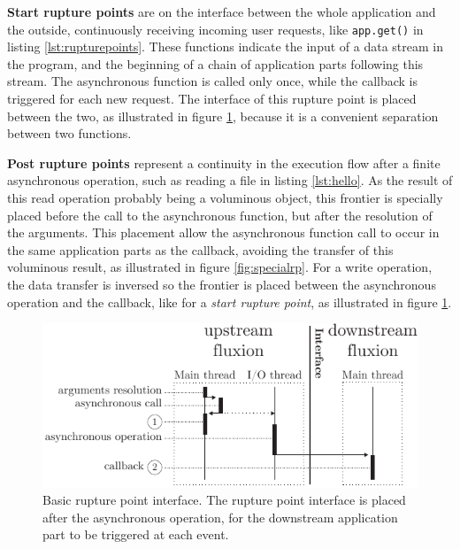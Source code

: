 \textbf{Start rupture points} are on the interface between the whole application and the outside, continuously receiving incoming user requests, like \texttt{app.get()} in listing \ref{lst:rupturepoints}.
These functions indicate the input of a data stream in the program, and the beginning of a chain of application parts following this stream.
The asynchronous function is called only once, while the callback is triggered for each new request.
The interface of this rupture point is placed between the two, as illustrated in figure \ref{fig:basicrp}, because it is a convenient separation between two functions.

\textbf{Post rupture points} represent a continuity in the execution flow after a finite asynchronous operation, such as reading a file in listing \ref{lst:hello}.
As the result of this read operation probably being a voluminous object, this frontier is specially placed before the call to the asynchronous function, but after the resolution of the arguments.
This placement allow the asynchronous function call to occur in the same application parts as the callback, avoiding the transfer of this voluminous result, as illustrated in figure \ref{fig:specialrp}.
For a write operation, the data transfer is inversed so the frontier is placed between the asynchronous operation and the callback, like for a \textit{start rupture point}, as illustrated in figure \ref{fig:basicrp}.

\begin{figure}[h!]
\begin{center}
  \includegraphics[width=\linewidth]{ressources/basicrp.pdf}
  \caption{Basic rupture point interface. \textnormal{The rupture point interface is placed after the asynchronous operation, for the downstream application part to be triggered at each event.}}
  \label{fig:basicrp}
\end{center}
\end{figure}


